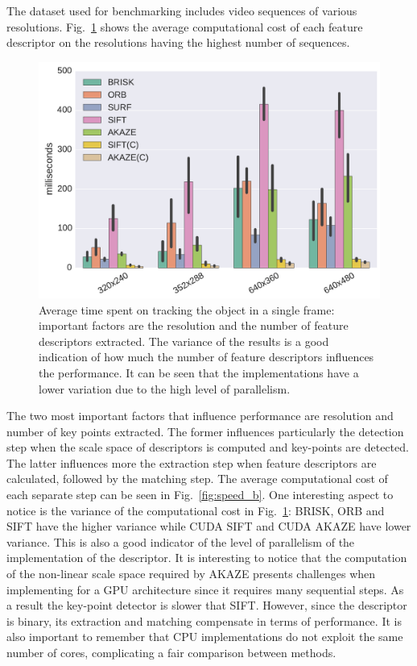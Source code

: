 The dataset used for benchmarking includes video sequences of various resolutions. Fig.~\ref{fig:speed} shows the average computational cost of each feature descriptor on the resolutions having the highest number of sequences. 

\begin{figure}[!htb]
	\includegraphics[width=0.95\linewidth]{imgs/tracker_fps_std.pdf}
\vspace{-2.5mm}	
\caption{Average time spent on tracking the object in a single frame: important factors are the resolution and the number of feature descriptors extracted. The variance of the results is a good indication of how much the number of feature descriptors influences the performance. It can be seen that the implementations have a lower variation due to the high level of parallelism. }
\vspace{-3mm}
\label{fig:speed}
\end{figure}

The two most important factors that influence performance are resolution and number of key points extracted. The former influences particularly the detection step when the scale space of descriptors is computed and key-points are detected. The latter influences more the extraction step when feature descriptors are calculated, followed by the matching step. The average computational cost of each separate step can be seen in Fig.~\ref{fig:speed_b}. One interesting aspect to notice is the variance of the computational cost in Fig.~\ref{fig:speed}: BRISK, ORB and SIFT have the higher variance while CUDA SIFT and CUDA AKAZE have lower variance. This is also a good indicator of the level of parallelism of the implementation of the descriptor. It is interesting to notice that the computation of the non-linear scale space required by AKAZE presents challenges when implementing for a GPU architecture since it requires many sequential steps. As a result the key-point detector is slower that SIFT. However, since the descriptor is binary, its extraction and matching compensate in terms of performance. It is also important to remember that CPU implementations do not exploit the same number of cores, complicating a fair comparison between methods.


